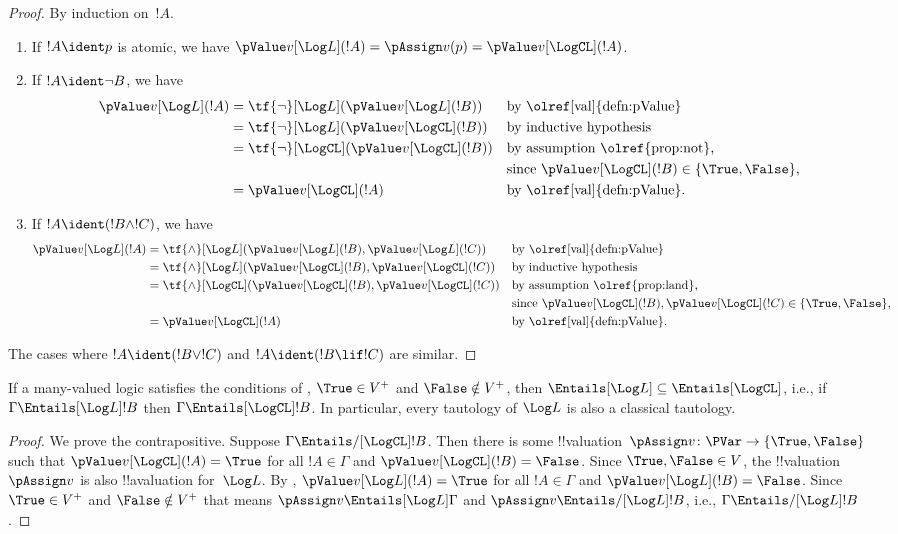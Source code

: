 \documentclass[../../../include/open-logic-section]{subfiles}
\begin{document}
\begin{proof}
  By induction on~$!A$.
  \begin{enumerate}
  \item If $!A \ident p$ is atomic, we have $\pValue v[\Log L](!A) =
  \pAssign v(p) = \pValue
  v[\LogCL](!A)$.
  \item If $!A \ident \lnot B$, we have
  \begin{align*}
    \pValue v[\Log L](!A) & = \tf{\lnot}[\Log L](\pValue v[\Log L](!B)) & &\text{by \olref[val]{defn:pValue}}\\
    & = \tf{\lnot}[\Log L](\pValue v[\LogCL](!B)) && \text{by inductive hypothesis}\\
    & = \tf{\lnot}[\LogCL](\pValue v[\LogCL](!B)) 
&&\text{by assumption \olref{prop:not},}\\
&&&\text{since $\pValue v[\LogCL](!B) \in \{\True, \False\}$,}\\
& = \pValue v[\LogCL](!A) &&\text{by \olref[val]{defn:pValue}}.
\end{align*}
\item If $!A \ident (!B \land !C)$, we have
\begin{align*}
  \pValue v[\Log L](!A) & = \tf{\land}[\Log L](\pValue v[\Log L](!B), \pValue v[\Log L](!C)) & &\text{by \olref[val]{defn:pValue}}\\
  & = \tf{\land}[\Log L](\pValue v[\LogCL](!B),\pValue v[\LogCL](!C)) && \text{by inductive hypothesis}\\
  & = \tf{\land}[\LogCL](\pValue v[\LogCL](!B),\pValue v[\LogCL](!C)) 
&&\text{by assumption \olref{prop:land},}\\
&&&\text{since $\pValue v[\LogCL](!B),\pValue v[\LogCL](!C) \in \{\True, \False\}$,}\\
& = \pValue v[\LogCL](!A) &&\text{by \olref[val]{defn:pValue}}.
\end{align*}
\end{enumerate}
The cases where $!A \ident (!B \lor !C)$ and $!A \ident (!B \lif !C)$
are similar.
\end{proof}

\begin{cor}
  If a many-valued logic satisfies the conditions of
  , $\True \in V^+$ and $\False \notin V^+$, then
  ${\Entails[\Log L]} \subseteq {\Entails[\LogCL]}$, i.e., if $\Gamma
  \Entails[\Log L] !B$ then $\Gamma \Entails[\LogCL] !B$. In
  particular, every tautology of $\Log L$ is also a classical tautology.
\end{cor}

\begin{proof}
  We prove the contrapositive. Suppose $\Gamma \Entails/[\LogCL] !B$.
  Then there is some !!{valuation}~$\pAssign v\colon \PVar \to
  \{\True, \False\}$ such that $\pValue v[\LogCL](!A) = \True$ for all
  $!A \in \Gamma$ and $\pValue v[\LogCL](!B) = \False$. Since $\True,
  \False \in V$, the !!{valuation}~$\pAssign v$ is also !!a{valuation}
  for~$\Log L$. By , $\pValue v[\Log L](!A) =
  \True$ for all $!A \in \Gamma$ and $\pValue v[\Log L](!B) = \False$.
  Since $\True \in V^+$ and $\False \notin V^+$ that means $\pAssign v
  \Entails[\Log L] \Gamma$ and $\pAssign v \Entails/[\Log L] !B$,
  i.e., $\Gamma \Entails/[\Log L] !B$.
\end{proof}
\end{document}
